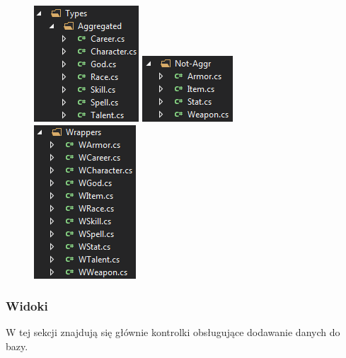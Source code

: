 \documentclass{article}
\begin{document}
\begin{figure}[h!]
\begin{center}
    
\centering
\includegraphics[]{typyag.png}\hfill
\includegraphics[]{typynag.png}\hfill
\includegraphics[]{wrapper.png}

\end{center}
\end{figure}

\subsubsection*{Widoki}
W tej sekcji znajdują się głównie kontrolki obsługujące dodawanie danych do bazy.
\end{document}
